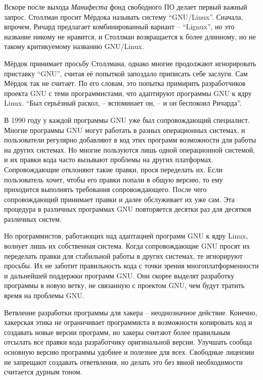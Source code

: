 Вскоре после выхода \textit{Манифеста} фонд свободного ПО делает первый важный запрос. Столлман просит Мёрдока называть систему \enquote{GNU/Linux}. Сначала, впрочем, Ричард предлагает комбинированный вариант -- \enquote{Lignux}, но это название никому не нравится, и Столлман возвращается к более длинному, но не такому критикуемому названию GNU/Linux.

Мёрдок принимает просьбу Столлмана, однако многие продолжают игнорировать приставку \enquote{GNU}, считая её попыткой запоздало приписать себе заслуги. Сам Мёрдок так не считает. По его словам, это попытка примирить разработчиков проекта GNU с теми программистами, что адаптируют программы GNU к ядру Linux. \enquote{Был серьёзный раскол, -- вспоминает он, -- и он беспокоил Ричарда}.

В 1990 году у каждой программы GNU уже был сопровождающий специалист. Многие программы GNU могут работать в разных операционных системах, и пользователи регулярно добавляют в код этих программ возможности для работы на других системах. Но многие пользуются лишь одной операционной системой, и их правки кода часто вызывают проблемы на других платформах. Сопровождающие отклоняют такие правки, прося переделать их. Если пользователь хочет, чтобы его правки попали в общую версию, то ему приходится выполнять требования сопровождающего. После чего сопровождающий принимает правки и далее обслуживает их уже сам. Эта процедура в различных программах GNU повторяется десятки раз для десятков различных систем.

Но программистов, работающих над адаптацией программ GNU к ядру Linux, волнует лишь их собственная система. Когда сопровождающие GNU просят их переделать правки для стабильной работы в других системах, те игнорируют просьбы. Их не заботит правильность кода с точки зрения многоплатформенности и дальнейшей поддержки программ GNU. Они скорее выделят разработку программы в новую ветку, не связанную с проектом GNU, чем будут тратить время на проблемы GNU.

Ветвление разработки программы для хакера -- неоднозначное действие. Конечно, хакерская этика не ограничивает программиста в возможности копировать код и создавать новые версии программ, но хакеры считают более правильным отсылать все правки кода разработчику оригинальной версии. Улучшать сообща основную версию программы удобнее и полезнее для всех. Свободные лицензии не запрещают создавать ответвления, но делать это без явной необходимости считается дурным тоном.

